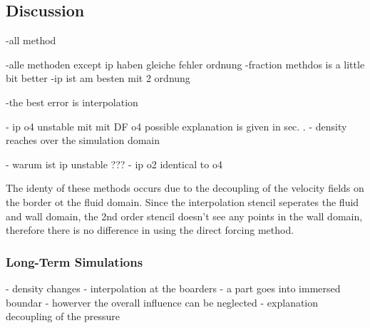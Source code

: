 \clearpage

\subsection{Discussion}

-all method



-alle methoden except ip haben gleiche fehler ordnung
-fraction methdos is a little bit better
-ip ist am besten mit 2 ordnung

-the best error is interpolation

- ip o4 unstable mit mit DF o4 possible explanation is given in sec. .
- density reaches over the simulation domain


- warum ist ip unstable ???
- ip o2 identical to o4


 The identy of these methods occurs due to the decoupling of the velocity fields
on the border ot the fluid domain. Since the interpolation stencil seperates the fluid and wall domain, the 2nd order
stencil doesn't see any points in the wall domain, therefore there is no difference in using the direct forcing method.\\

\subsubsection{Long-Term Simulations}
- density changes
- interpolation at the boarders
- a part goes into immersed boundar
- howerver the overall influence can be neglected
- explanation decoupling of the pressure



